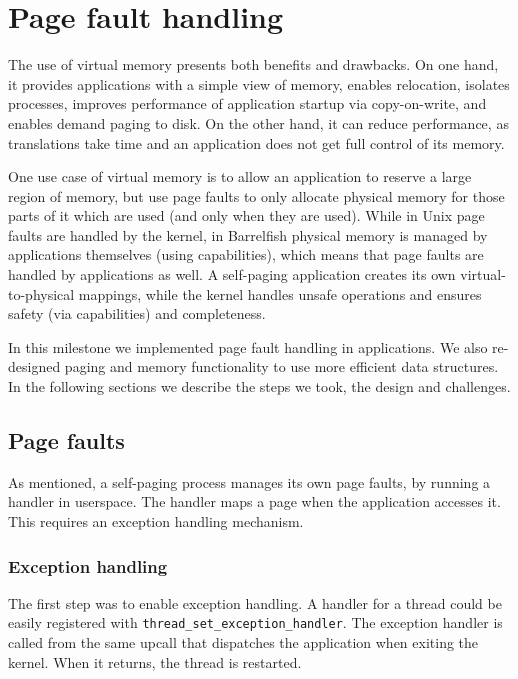 \chapter{Page fault handling}

The use of virtual memory presents both benefits and drawbacks.
On one hand, it provides applications with a simple view of memory, enables relocation, isolates processes, improves performance of application startup via copy-on-write, and enables demand paging to disk.
On the other hand, it can reduce performance, as translations take time and an application does not get full control of its memory.

One use case of virtual memory is to allow an application to reserve a large region of memory, but use page faults to only allocate physical memory for those parts of it which are used (and only when they are used).
While in Unix page faults are handled by the kernel, in Barrelfish physical memory is managed by applications themselves (using capabilities), which means that page faults are handled by applications as well.
A self-paging application creates its own virtual-to-physical mappings, while the kernel handles unsafe operations and ensures safety (via capabilities) and completeness.

In this milestone we implemented page fault handling in applications.
We also re-designed paging and memory functionality to use more efficient data structures.
In the following sections we describe the steps we took, the design and challenges.


\section{Page faults}

As mentioned, a self-paging process manages its own page faults, by running a handler in userspace.
The handler maps a page when the application accesses it.
This requires an exception handling mechanism.


\subsection{Exception handling}

The first step was to enable exception handling.
A handler for a thread could be easily registered with \verb|thread_set_exception_handler|.
The exception handler is called from the same upcall that dispatches the application when exiting the kernel.
When it returns, the thread is restarted.

